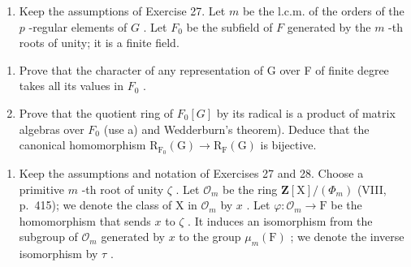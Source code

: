 \begin{enumerate}
\def\labelenumi{\arabic{enumi})}
\setcounter{enumi}{27}
\tightlist
\item
  Keep the assumptions of Exercise 27. Let \(m\) be the l.c.m. of the orders of the \(p\) -regular elements of \(G\) . Let \(F_0\) be the subfield of \(F\) generated by the \(m\) -th roots of unity; it is a finite field.
\end{enumerate}

\begin{enumerate}
\def\labelenumi{\alph{enumi})}
\item
  Prove that the character of any representation of G over F of finite degree takes all its values in \(F_{0}\) .
\item
  Prove that the quotient ring of \(F_{0}[G]\) by its radical is a product of matrix algebras over \(F_{0}\) (use a) and Wedderburn's theorem). Deduce that the canonical homomorphism \(\mathrm{R}_{\mathrm{F}_{0}}(\mathrm{G}) \to \mathrm{R}_{\mathrm{F}}(\mathrm{G})\) is bijective.
\end{enumerate}

\begin{enumerate}
\def\labelenumi{\arabic{enumi})}
\setcounter{enumi}{28}
\tightlist
\item
  Keep the assumptions and notation of Exercises 27 and 28. Choose a primitive \(m\) -th root of unity \(\zeta\) . Let \(\mathcal{O}_m\) be the ring \(\mathbf{Z}[\mathrm{X}] / (\Phi_m)\) (VIII, p.~415); we denote the class of X in \(\mathcal{O}_m\) by \(x\) . Let \(\varphi : \mathcal{O}_m \to \mathrm{F}\) be the homomorphism that sends \(x\) to \(\zeta\) . It induces an isomorphism from the subgroup of \(\mathcal{O}_m\) generated by \(x\) to the group \(\mu_m(\mathrm{F})\) ; we denote the inverse isomorphism by \(\tau\) .
\end{enumerate}

